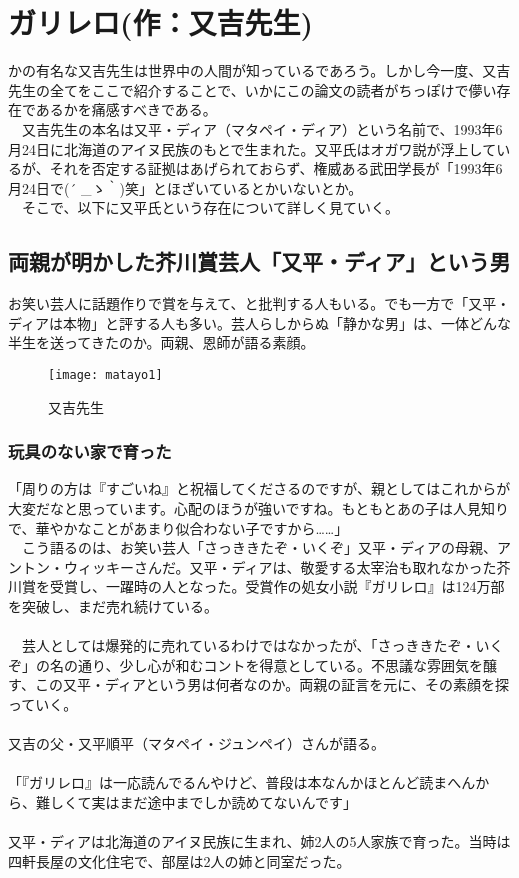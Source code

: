 

\section{ガリレロ(作：又吉先生)}

かの有名な又吉先生は世界中の人間が知っているであろう。しかし今一度、又吉先生の全てをここで紹介することで、いかにこの論文の読者がちっぽけで儚い存在であるかを痛感すべきである。\\
　又吉先生の本名は又平・ディア（マタペイ・ディア）という名前で、1993年6月24日に北海道のアイヌ民族のもとで生まれた。又平氏はオガワ説が浮上しているが、それを否定する証拠はあげられておらず、権威ある武田学長が「1993年6月24日で\sf(´ \_ゝ｀)笑」とほざいているとかいないとか。\\
　そこで、以下に又平氏という存在について詳しく見ていく。
\subsection{両親が明かした芥川賞芸人「又平・ディア」という男}
お笑い芸人に話題作りで賞を与えて、と批判する人もいる。でも一方で「又平・ディアは本物」と評する人も多い。芸人らしからぬ「静かな男」は、一体どんな半生を送ってきたのか。両親、恩師が語る素顔。
\begin{figure}[H]
\centering
\texttt{[image: matayo1]}
\caption{又吉先生}
\label{matayo1}
\end{figure}

\subsubsection{玩具のない家で育った}

「周りの方は『すごいね』と祝福してくださるのですが、親としてはこれからが大変だなと思っています。心配のほうが強いですね。もともとあの子は人見知りで、華やかなことがあまり似合わない子ですから……」\\
　こう語るのは、お笑い芸人「さっききたぞ・いくぞ」又平・ディアの母親、アントン・ウィッキーさんだ。又平・ディアは、敬愛する太宰治も取れなかった芥川賞を受賞し、一躍時の人となった。受賞作の処女小説『ガリレロ』は124万部を突破し、まだ売れ続けている。\\
　\\
　芸人としては爆発的に売れているわけではなかったが、「さっききたぞ・いくぞ」の名の通り、少し心が和むコントを得意としている。不思議な雰囲気を醸す、この又平・ディアという男は何者なのか。両親の証言を元に、その素顔を探っていく。\\
　\\
又吉の父・又平順平（マタペイ・ジュンペイ）さんが語る。\\
　\\
「『ガリレロ』は一応読んでるんやけど、普段は本なんかほとんど読まへんから、難しくて実はまだ途中までしか読めてないんです」\\
　\\
又平・ディアは北海道のアイヌ民族に生まれ、姉2人の5人家族で育った。当時は四軒長屋の文化住宅で、部屋は2人の姉と同室だった。\\

